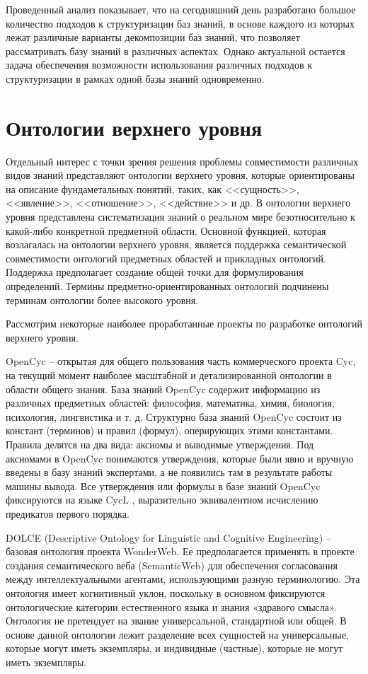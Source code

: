 Проведенный анализ показывает, что на сегодняшний день разработано большое количество подходов к структуризации баз знаний, в основе каждого из которых лежат различные варианты декомпозиции баз знаний, что позволяет рассматривать базу знаний в различных аспектах. Однако актуальной остается задача обеспечения возможности использования различных подходов к структуризации в рамках одной базы знаний одновременно.

\newpage
\section{Онтологии верхнего уровня}

Отдельный интерес с точки зрения решения проблемы совместимости различных видов знаний представляют онтологии верхнего уровня, которые ориентированы на описание фундаметальных понятий, таких, как <<сущность>>, <<явление>>, <<отношение>>, <<действие>> и др. В онтологии верхнего уровня представлена систематизация знаний о реальном мире безотносительно к какой-либо конкретной предметной области. Основной функцией, которая возлагалась на онтологии верхнего уровня, является поддержка семантической совместимости онтологий предметных областей и прикладных онтологий. Поддержка предполагает создание общей точки для формулирования определений. Термины предметно-ориентированных онтологий подчинены терминам онтологии более высокого уровня.

Рассмотрим некоторые наиболее проработанные проекты по разработке онтологий верхнего уровня.

OpenCyc \cite{OpenCyc} -- открытая для общего пользования часть коммерческого проекта Cyc, на текущий момент наиболее масштабной и детализированной онтологии в области общего знания. База знаний OpenCyc содержит информацию из различных предметных областей: философия, математика, химия, биология, психология, лингвистика и т. д. Структурно база знаний OpenCyc состоит из констант (терминов) и правил (формул), оперирующих этими константами. Правила делятся на два вида: аксиомы и выводимые утверждения. Под аксиомами в OpenCyc понимаются утверждения, которые были явно и вручную введены в базу знаний экспертами, а не появились там в результате работы машины вывода. Все утверждения или формулы в базе знаний OpenCyc фиксируются на языке CycL \cite{CycL2016}, выразительно эквивалентном исчислению предикатов первого порядка.

DOLCE (Descriptive Ontology for Linguistic and Cognitive Engineering) \cite{DOLCE} -- базовая онтология проекта WonderWeb. Ее предполагается применять в проекте создания семантического веба (SemanticWeb) для обеспечения согласования между интеллектуальными агентами, использующими разную терминологию. Эта онтология имеет когнитивный уклон, поскольку в основном фиксируются онтологические категории естественного языка и знания «здравого смысла». Онтология не претендует на звание универсальной, стандартной или общей. В основе данной онтологии лежит разделение всех сущностей на универсальные, которые могут иметь экземпляры, и индивидные (частные), которые не могут иметь экземпляры.


